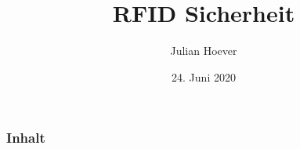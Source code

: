 \documentclass{beamer}
\title{RFID Sicherheit}
\author{Julian Hoever}
\date{24. Juni 2020}
\begin{document}
\begin{frame}
\titlepage
\end{frame}


\begin{frame}
\frametitle{Inhalt}

\tableofcontents
\end{frame}
\end{document}
